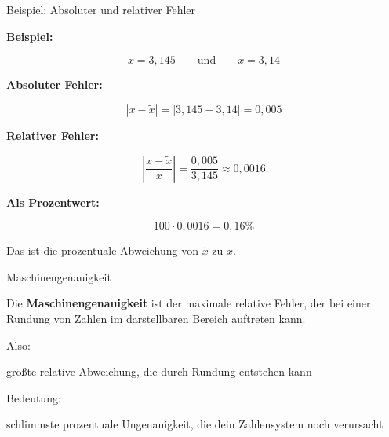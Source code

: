 \documentclass{beamer}
\begin{document}
\begin{frame}{Beispiel: Absoluter und relativer Fehler}

\small

\textbf{Beispiel:}

\[
x=3{,}145
\qquad\text{und}\qquad
\tilde{x}=3{,}14
\]

\vspace{0.5cm}

\textbf{Absoluter Fehler:}

\[
|x-\tilde{x}|
=
|3{,}145-3{,}14|
=
0{,}005
\]

\vspace{0.5cm}

\textbf{Relativer Fehler:}

\[
\left|\frac{x-\tilde{x}}{x}\right|
=
\frac{0{,}005}{3{,}145}
\approx
0{,}0016
\]

\vspace{0.5cm}

\textbf{Als Prozentwert:}

\[
100\cdot 0{,}0016 = 0{,}16\%
\]

Das ist die prozentuale Abweichung von \(\tilde{x}\) zu \(x\).

\end{frame}

\begin{frame}{Maschinengenauigkeit}

\small

Die \textbf{Maschinengenauigkeit} ist der maximale relative Fehler,  
der bei einer Rundung von Zahlen im darstellbaren Bereich auftreten kann.

\vspace{0.6cm}

Also:

\begin{center}
größte relative Abweichung, die durch Rundung entstehen kann
\end{center}

\vspace{0.6cm}

Bedeutung:

\begin{center}
schlimmste prozentuale Ungenauigkeit,  
die dein Zahlensystem noch verursacht
\end{center}

\end{frame}
\end{document}
